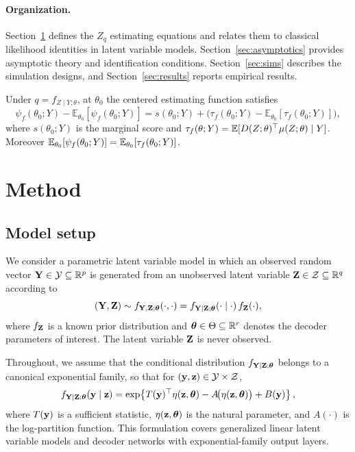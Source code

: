 \documentclass[twoside,11pt]{article}
\begin{document}
\paragraph{Organization.}
Section~\ref{sec:method} defines the $Z_q$ estimating equations and relates them to classical likelihood identities in latent variable models.
Section~\ref{sec:asymptotics} provides asymptotic theory and identification conditions.
Section~\ref{sec:sims} describes the simulation designs, and Section~\ref{sec:results} reports empirical results.



\begin{lemma}
Under $q=f_{Z\mid Y;\theta}$, at $\theta_0$ the centered estimating function satisfies
\[
\psi_f(\theta_0;Y)-\mathbb E_{\theta_0}[\psi_f(\theta_0;Y)]
=
s(\theta_0;Y)+\Big(\tau_f(\theta_0;Y)-\mathbb E_{\theta_0}[\tau_f(\theta_0;Y)]\Big),
\]
where $s(\theta_0;Y)$ is the marginal score and
$\tau_f(\theta;Y)=\mathbb{E}[D(Z;\theta)^\top \mu(Z;\theta)\mid Y]$.
Moreover $\mathbb{E}_{\theta_0}[\psi_f(\theta_0;Y)]=\mathbb{E}_{\theta_0}[\tau_f(\theta_0;Y)]$.
\end{lemma}


\section{Method}
\label{sec:method}

\subsection{Model setup}

We consider a parametric latent variable model in which an observed random vector
${\bf Y} \in \mathcal Y \subseteq \mathbb R^p$ is generated from an unobserved latent variable
${\bf Z} \in \mathcal Z \subseteq \mathbb R^q$ according to
\[
({\bf Y},{\bf Z}) \sim f_{{\bf Y},{\bf Z};{\bm{\theta}}}(\cdot,\cdot)
= f_{{\bf Y}\mid{\bf Z};{\bm{\theta}}}(\cdot\mid\cdot)\,f_{\bf Z}(\cdot),
\]
where $f_{\bf Z}$ is a known prior distribution and ${\bm{\theta}}\in\Theta\subseteq\mathbb R^r$ denotes
the decoder parameters of interest. The latent variable ${\bf Z}$ is never observed.

Throughout, we assume that the conditional distribution $f_{{\bf Y}\mid{\bf Z};{\bm{\theta}}}$ belongs to
a canonical exponential family, so that for $({\bf y},{\bf z})\in\mathcal Y\times\mathcal Z$,
\[
f_{{\bf Y}\mid{\bf Z};{\bm{\theta}}}({\bf y}\mid{\bf z})
=
\exp\!\left\{
T({\bf y})^\top \eta({\bf z},{\bm{\theta}})
-
A\!\bigl(\eta({\bf z},{\bm{\theta}})\bigr)
+
B({\bf y})
\right\},
\]
where $T({\bf y})$ is a sufficient statistic, $\eta({\bf z},{\bm{\theta}})$ is the natural parameter, and
$A(\cdot)$ is the log-partition function. This formulation covers generalized linear
latent variable models and decoder networks with exponential-family output layers.
\end{document}
